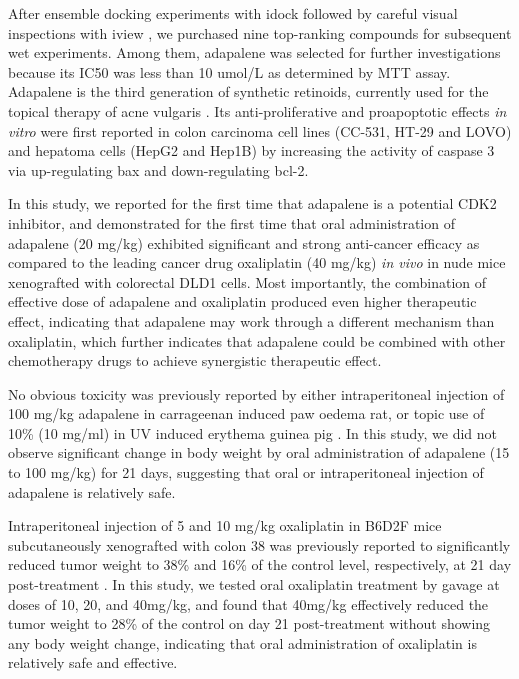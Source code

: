 After ensemble docking experiments with idock \citep{1153,1362} followed by careful visual inspections with iview \citep{1366}, we purchased nine top-ranking compounds for subsequent wet experiments. Among them, adapalene was selected for further investigations because its IC50 was less than 10 umol/L as determined by MTT assay. Adapalene is the third generation of synthetic retinoids, currently used for the topical therapy of acne vulgaris \citep{1599}. Its anti-proliferative and proapoptotic effects \textit{in vitro} were first reported in colon carcinoma cell lines (CC-531, HT-29 and LOVO) \citep{1600} and hepatoma cells (HepG2 and Hep1B) \citep{1601} by increasing the activity of caspase 3 via up-regulating bax and down-regulating bcl-2.

In this study, we reported for the first time that adapalene is a potential CDK2 inhibitor, and demonstrated for the first time that oral administration of adapalene (20 mg/kg) exhibited significant and strong anti-cancer efficacy as compared to the leading cancer drug oxaliplatin (40 mg/kg) \textit{in vivo} in nude mice xenografted with colorectal DLD1 cells. Most importantly, the combination of effective dose of adapalene and oxaliplatin produced even higher therapeutic effect, indicating that adapalene may work through a different mechanism than oxaliplatin, which further indicates that adapalene could be combined with other chemotherapy drugs to achieve synergistic therapeutic effect.

No obvious toxicity was previously reported by either intraperitoneal injection of 100 mg/kg adapalene in carrageenan induced paw oedema rat, or topic use of 10\% (10 mg/ml) in UV induced erythema guinea pig \citep{1604}. In this study, we did not observe significant change in body weight by oral administration of adapalene (15 to 100 mg/kg) for 21 days, suggesting that oral or intraperitoneal injection of adapalene is relatively safe.

Intraperitoneal injection of 5 and 10 mg/kg oxaliplatin in B6D2F mice subcutaneously xenografted with colon 38 was previously reported to significantly reduced tumor weight to 38\% and 16\% of the control level, respectively, at 21 day post-treatment \citep{1605}. In this study, we tested oral oxaliplatin treatment by gavage at doses of 10, 20, and 40mg/kg, and found that 40mg/kg effectively reduced the tumor weight to 28\% of the control on day 21 post-treatment without showing any body weight change, indicating that oral administration of oxaliplatin is relatively safe and effective.

